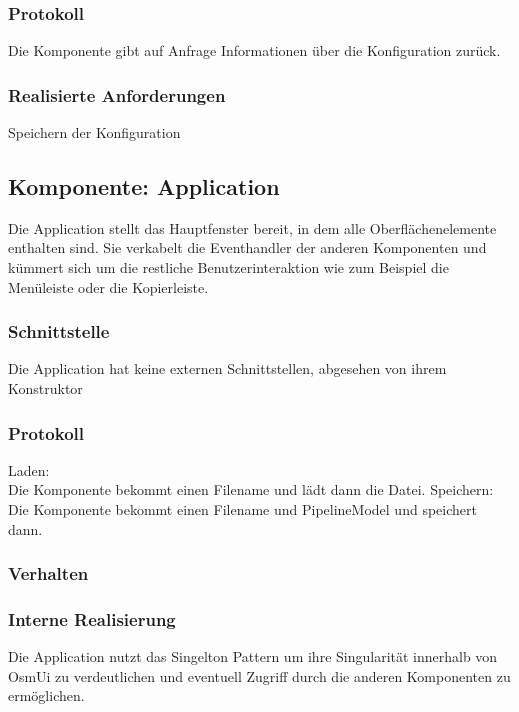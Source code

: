\documentclass[a4paper,12pt]{scrartcl}
\begin{document}
\subsubsection{Protokoll}
Die Komponente gibt auf Anfrage Informationen über die Konfiguration zurück.
\subsubsection{Realisierte Anforderungen}
Speichern der Konfiguration

\subsection{Komponente: Application}
Die Application stellt das Hauptfenster bereit, in dem alle Oberflächenelemente enthalten sind.
Sie verkabelt die Eventhandler der anderen Komponenten und kümmert sich um die restliche Benutzerinteraktion wie zum Beispiel die Menüleiste oder die Kopierleiste.
\subsubsection{Schnittstelle}
Die Application hat keine externen Schnittstellen, abgesehen von ihrem Konstruktor
\subsubsection{Protokoll}
Laden: \\
Die Komponente bekommt einen Filename und lädt dann die Datei.
Speichern: \\
Die Komponente bekommt einen Filename und PipelineModel und speichert dann.
\subsubsection{Verhalten}
\subsubsection{Interne Realisierung}
Die Application nutzt das Singelton Pattern um ihre Singularität innerhalb von OsmUi zu verdeutlichen und eventuell Zugriff durch die anderen Komponenten zu ermöglichen.
\end{document}
